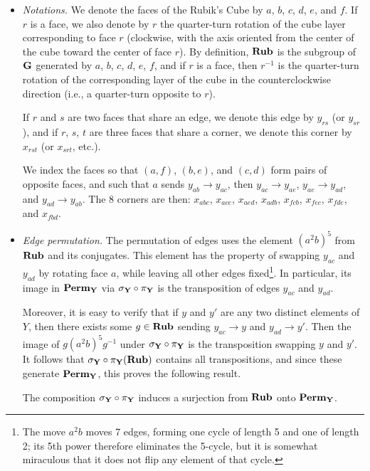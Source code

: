 \begin{itemize}
    \item \emph{Notations.} We denote the faces of the Rubik's Cube by $a$, $b$, $c$, $d$, $e$, and $f$.
    If $r$ is a face, we also denote by $r$ the quarter-turn rotation of the cube layer corresponding to face $r$ (clockwise, with the axis oriented from the center of the cube toward the center of face $r$).
    By definition, $\mathbf{Rub}$ is the subgroup of $\mathbf{G}$ generated by $a$, $b$, $c$, $d$, $e$, $f$, and if $r$ is a face, then $r^{-1}$ is the quarter-turn rotation of the corresponding layer of the cube in the counterclockwise direction (i.e., a quarter-turn opposite to $r$).

    If $r$ and $s$ are two faces that share an edge, we denote this edge by $y_{rs}$ (or $y_{sr}$), and if $r$, $s$, $t$ are three faces that share a corner, we denote this corner by $x_{rst}$ (or $x_{srt}$, etc.).

    We index the faces so that $(a, f)$, $(b, e)$, and $(c, d)$ form pairs of opposite faces, and such that $a$ sends $y_{ab} \to y_{ac}$, then $y_{ac} \to y_{ae}$, $y_{ae} \to y_{ad}$, and $y_{ad} \to y_{ab}$.
    The 8 corners are then:
    $x_{abc}$, $x_{ace}$, $x_{aed}$, $x_{adb}$, $x_{fcb}$, $x_{fec}$, $x_{fde}$, and $x_{fbd}$.

    \item \emph{Edge permutation.}
    The permutation of edges uses the element $(a^2b)^5$ from $\mathbf{Rub}$ and its conjugates.
    This element has the property of swapping $y_{ac}$ and $y_{ad}$ by rotating face $a$, while leaving all other edges fixed\footnote{The move $a^2 b$ moves 7 edges, forming one cycle of length 5 and one of length 2; its 5th power therefore eliminates the 5-cycle, but it is somewhat miraculous that it does not flip any element of that cycle.}.
    In particular, its image in $\mathbf{Perm}_{\mathbf{Y}}$ via $\sigma_{\mathbf{Y}} \circ \pi_{\mathbf{Y}}$ is the transposition of edges $y_{ac}$ and $y_{ad}$.

    Moreover, it is easy to verify that if $y$ and $y'$ are any two distinct elements of $Y$, then there exists some $g \in \mathbf{Rub}$ sending $y_{ac} \to y$ and $y_{ad} \to y'$.
    Then the image of $g(a^2b)^5g^{-1}$ under $\sigma_{\mathbf{Y}} \circ \pi_{\mathbf{Y}}$ is the transposition swapping $y$ and $y'$.
    It follows that $\sigma_{\mathbf{Y}} \circ \pi_{\mathbf{Y}}(\mathbf{Rub})$ contains all transpositions, and since these generate $\mathbf{Perm}_{\mathbf{Y}}$, this proves the following result.

    \begin{lemma}
        \label{lem:comp}
        The composition $\sigma_{\mathbf{Y}} \circ \pi_{\mathbf{Y}}$ induces a surjection from $\mathbf{Rub}$ onto $\mathbf{Perm}_{\mathbf{Y}}$.
    \end{lemma}


\end{itemize}
